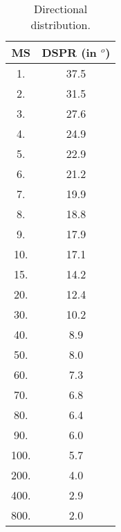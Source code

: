 \documentclass[12pt]{book}
\begin{document}
                        \begin{table}[htb]
                        \begin{center}
                        \caption{Directional distribution.}
                        \label{tab:dspr}
                        \begin{tabular}{c c}
                        \hline
                        MS & DSPR (in $^o$) \\
                        \hline
                        1.   &  37.5 \\
                        2.   &  31.5 \\
                        3.   &  27.6 \\
                        4.   &  24.9 \\
                        5.   &  22.9 \\
                        6.   &  21.2 \\
                        7.   &  19.9 \\
                        8.   &  18.8 \\
                        9.   &  17.9 \\
                        10.  &  17.1 \\
                        15.  &  14.2 \\
                        20.  &  12.4 \\
                        30.  &  10.2 \\
                        40.  &  8.9 \\
                        50.  &  8.0 \\
                        60.  &  7.3 \\
                        70.  &  6.8 \\
                        80.  &  6.4 \\
                        90.  &  6.0 \\
                        100. &  5.7 \\
                        200. & 4.0 \\
                        400. & 2.9 \\
                        800. & 2.0 \\
                        \hline
                        \end{tabular}
                        \end{center}
                        \end{table}
\end{document}
